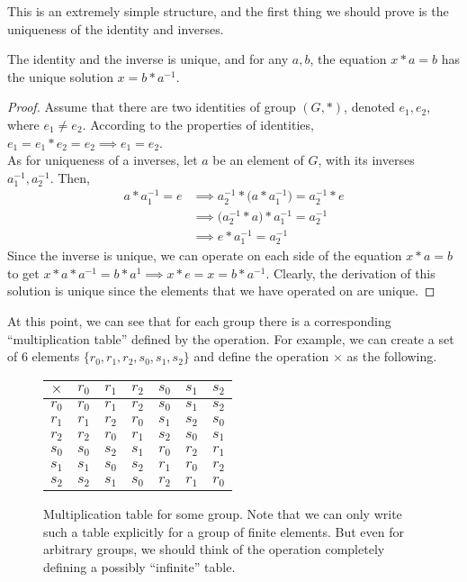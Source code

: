   This is an extremely simple structure, and the first thing we should prove is the uniqueness of the identity and inverses. 

  \begin{lemma}
    The identity and the inverse is unique, and for any $a, b$, the equation $x*a = b$ has the unique solution $x = b* a^{-1}$.
  \end{lemma}
  \begin{proof}
     Assume that there are two identities of group $(G,*)$, denoted $e_{1}, e_{2}$, where $e_{1} \neq e_{2}$. According to the properties of identities, $e_{1} = e_{1} * e_{2} = e_{2} \implies e_{1} = e_{2}$. \\
    As for uniqueness of a inverses, let $a$ be an element of $G$, with its inverses $a_{1}^{-1}, a_{2}^{-1}$. Then, 
    \begin{align*}
      a * a_{1}^{-1} = e & \implies a_{2}^{-1} * \Big(a * a_{1}^{-1} \Big)= a_{2}^{-1} * e \\
       & \implies \Big(a_{2}^{-1} * a \Big) * a_{1}^{-1} = a_{2}^{-1} \\
       & \implies e * a_{1}^{-1} = a_{2}^{-1}
    \end{align*}
    Since the inverse is unique, we can operate on each side of the equation $x*a = b$ to get $x*a*a^{-1} = b*a^{1} \implies x * e = x = b*a^{-1}$. Clearly, the derivation of this solution is unique since the elements that we have operated on are unique.
  \end{proof} 
  
  At this point, we can see that for each group there is a corresponding ``multiplication table'' defined by the operation. For example, we can create a set of $6$ elements $\{r_0, r_1, r_2, s_0, s_1, s_2\}$ and define the operation $\times$ as the following. 

  \begin{figure}[H]
    \centering 
    \begin{tabular}{c|cccccc}
      $\times$ & $r_0$ & $r_1$ & $r_2$ & $s_0$ & $s_1$ & $s_2$ \\
      \hline
      $r_0$ & $r_0$ & $r_1$ & $r_2$ & $s_0$ & $s_1$ & $s_2$ \\
      $r_1$ & $r_1$ & $r_2$ & $r_0$ & $s_1$ & $s_2$ & $s_0$ \\
      $r_2$ & $r_2$ & $r_0$ & $r_1$ & $s_2$ & $s_0$ & $s_1$ \\
      $s_0$ & $s_0$ & $s_2$ & $s_1$ & $r_0$ & $r_2$ & $r_1$ \\
      $s_1$ & $s_1$ & $s_0$ & $s_2$ & $r_1$ & $r_0$ & $r_2$ \\
      $s_2$ & $s_2$ & $s_1$ & $s_0$ & $r_2$ & $r_1$ & $r_0$ \\
    \end{tabular}
    \caption{Multiplication table for some group. Note that we can only write such a table explicitly for a group of finite elements. But even for arbitrary groups, we should think of the operation completely defining a possibly ``infinite'' table.} 
  \end{figure} 

